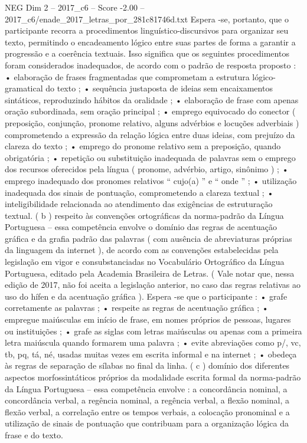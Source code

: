 \begin{textsample}{NEG Dim 2 – 2017\_c6 – Score -2.00 – 2017\_c6/enade\_2017\_letras\_por\_281c81746d.txt}
Espera -se, portanto, que o participante recorra a procedimentos linguístico-discursivos para organizar seu texto, permitindo o encadeamento lógico entre suas partes de forma a garantir a progressão e a coerência textuais.
Isso significa que os seguintes procedimentos foram considerados inadequados, de acordo com o padrão de resposta proposto : • elaboração de frases fragmentadas que comprometam a estrutura lógico-gramatical do texto ; • sequência justaposta de ideias sem encaixamentos sintáticos, reproduzindo hábitos da oralidade ; • elaboração de frase com apenas oração subordinada, sem oração principal ; • emprego equivocado do conector ( preposição, conjunção, pronome relativo, alguns advérbios e locuções adverbiais ) comprometendo a expressão da relação lógica entre duas ideias, com prejuízo da clareza do texto ; • emprego do pronome relativo sem a preposição, quando obrigatória ; • repetição ou substituição inadequada de palavras sem o emprego dos recursos oferecidos pela língua ( pronome, advérbio, artigo, sinônimo ) ; • emprego inadequado dos pronomes relativos “ cujo(a) ” e “ onde ” ; • utilização inadequada dos sinais de pontuação, comprometendo a clareza textual ; • inteligibilidade relacionada ao atendimento das exigências de estruturação textual. ( b ) respeito às convenções ortográficas da norma-padrão da Língua Portuguesa – essa competência envolve o domínio das regras de acentuação gráfica e da grafia padrão das palavras ( com ausência de abreviaturas próprias da linguagem da internet ), de acordo com as convenções estabelecidas pela legislação em vigor e consubstanciadas no Vocabulário Ortográfico da Língua Portuguesa, editado pela Academia Brasileira de Letras. ( Vale notar que, nessa edição de 2017, não foi aceita a legislação anterior, no caso das regras relativas ao uso do hífen e da acentuação gráfica ).
Espera -se que o participante : • grafe corretamente as palavras ; • respeite as regras de acentuação gráfica ; • empregue maiúsculas em início de frase, em nomes próprios de pessoas, lugares ou instituições ; • grafe as siglas com letras maiúsculas ou apenas com a primeira letra maiúscula quando formarem uma palavra ; • evite abreviações como p/, vc, tb, pq, tá, né, usadas muitas vezes em escrita informal e na internet ; • obedeça às regras de separação de sílabas no final da linha. ( c ) domínio dos diferentes aspectos morfossintáticos próprios da modalidade escrita formal da norma-padrão da Língua Portuguesa – essa competência envolve : a concordância nominal, a concordância verbal, a regência nominal, a regência verbal, a flexão nominal, a flexão verbal, a correlação entre os tempos verbais, a colocação pronominal e a utilização de sinais de pontuação que contribuam para a organização lógica da frase e do texto.

\end{textsample}
